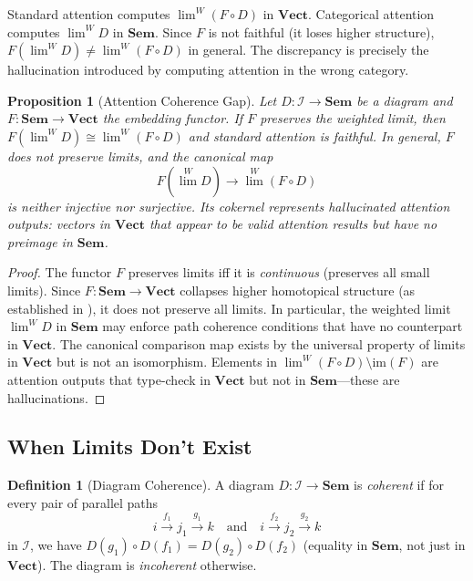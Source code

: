 \documentclass[11pt,a4paper]{article}
\theoremstyle{plain}
\newtheorem{proposition}[theorem]{Proposition}
\theoremstyle{definition}
\newtheorem{definition}[theorem]{Definition}
\theoremstyle{remark}
\newcommand{\Sem}{\mathbf{Sem}}
\newcommand{\Vect}{\mathbf{Vect}}
\begin{document}
\begin{center}
\end{center}

Standard attention computes $\lim^W (F \circ D)$ in $\Vect$.
Categorical attention computes $\lim^W D$ in $\Sem$.
Since $F$ is not faithful (it loses higher structure), $F(\lim^W D) \neq \lim^W(F \circ D)$ in general.
The discrepancy is precisely the hallucination introduced by computing attention in the wrong category.

\begin{proposition}[Attention Coherence Gap]\label{prop:attention-gap}
Let $D : \mathcal{I} \to \Sem$ be a diagram and $F : \Sem \to \Vect$ the embedding functor.
If $F$ preserves the weighted limit, then $F(\lim^W D) \cong \lim^W(F \circ D)$ and standard attention is faithful.
In general, $F$ does \emph{not} preserve limits, and the canonical map
\[
  F(\lim^W D) \to \lim^W(F \circ D)
\]
is neither injective nor surjective.
Its cokernel represents \emph{hallucinated attention outputs}: vectors in $\Vect$ that appear to be valid attention results but have no preimage in $\Sem$.
\end{proposition}

\begin{proof}
The functor $F$ preserves limits iff it is \emph{continuous} (preserves all small limits).
Since $F : \Sem \to \Vect$ collapses higher homotopical structure (as established in \cite{long2026homotopical}), it does not preserve all limits.
In particular, the weighted limit $\lim^W D$ in $\Sem$ may enforce path coherence conditions that have no counterpart in $\Vect$.
The canonical comparison map exists by the universal property of limits in $\Vect$ but is not an isomorphism.
Elements in $\lim^W(F \circ D) \setminus \mathrm{im}(F)$ are attention outputs that type-check in $\Vect$ but not in $\Sem$---these are hallucinations.
\end{proof}

\subsection{When Limits Don't Exist}

\begin{definition}[Diagram Coherence]\label{def:diagram-coherence}
A diagram $D : \mathcal{I} \to \Sem$ is \emph{coherent} if for every pair of parallel paths
\[
  i \xrightarrow{f_1} j_1 \xrightarrow{g_1} k \quad\text{and}\quad i \xrightarrow{f_2} j_2 \xrightarrow{g_2} k
\]
in $\mathcal{I}$, we have $D(g_1) \circ D(f_1) = D(g_2) \circ D(f_2)$ (equality in $\Sem$, not just in $\Vect$).
The diagram is \emph{incoherent} otherwise.
\end{definition}
\end{document}
